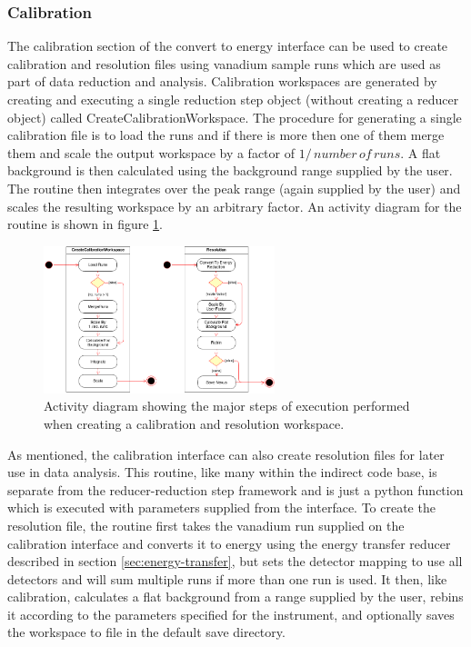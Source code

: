 \documentclass[paper=a4, fontsize=11pt]{scrartcl}	%
\numberwithin{equation}{section}															%
\numberwithin{figure}{section}																%
\numberwithin{table}{section}																%
\begin{document}
\subsubsection{Calibration}
\label{subsec:c2e-calibration}
The calibration section of the convert to energy interface can be used to create calibration and resolution files using vanadium sample runs which are used as part of data reduction and analysis. Calibration workspaces are generated by creating and executing a single reduction step object  (without creating a reducer object) called CreateCalibrationWorkspace. The procedure for generating a single calibration file is to load the runs and if there is more then one of them merge them and scale the output workspace by a factor of $1/\,number\,of\,runs$. A flat background is then calculated using the background range supplied by the user. The routine then integrates over the peak range (again supplied by the user) and scales the resulting workspace by an arbitrary factor. An activity diagram for the routine is shown in figure \ref{fig:c2e-calibration-activity-diagram}.

\begin{figure}[H]
\centering
\includegraphics[width=0.6\textwidth]{img/uml/activity_diagrams/Calibration_activity.png}
\caption{Activity diagram showing the major steps of execution performed when creating a calibration and resolution workspace.}
\label{fig:c2e-calibration-activity-diagram}
\end{figure}

As mentioned, the calibration interface can also create resolution files for later use in data analysis. This routine, like many within the indirect code base, is separate from the reducer-reduction step  framework and is just a python function which is executed with parameters supplied from the interface. To create the resolution file, the routine first takes the vanadium run supplied on the calibration interface and converts it to energy using the energy transfer reducer described in section \ref{sec:energy-transfer}, but sets the detector mapping to use all detectors and will sum multiple runs if more than one run is used. It then, like calibration, calculates a flat background from a range supplied by the user, rebins it according to the parameters specified for the instrument, and optionally saves the workspace to file in the default save directory.
\end{document}
